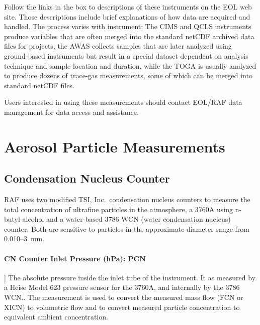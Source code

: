 \documentclass[
  english,
]{book}
\newcommand{\textgreek}[2][]{\foreignlanguage{greek}{#2}}
\begin{document}
Follow the links in the box to descriptions of these instruments on the EOL web site. Those descriptions include brief explanations of how data are acquired and handled. The process varies with instrument; The CIMS and QCLS instruments produce variables that are often merged into the standard netCDF archived data files for projects, the AWAS collects samples that are later analyzed using ground-based instruments but result in a special dataset dependent on analysis technique and sample location and duration, while the TOGA is usually analyzed to produce dozens of trace-gas measurements, some of which can be merged into standard netCDF files.

Users interested in using these measurements should contact EOL/RAF data management for data access and assistance.

\hypertarget{aerosol-particle-measurements}{%
\chapter{Aerosol Particle Measurements}\label{aerosol-particle-measurements}}

\hypertarget{condensation-nucleus-counter}{%
\section{Condensation Nucleus Counter}\label{condensation-nucleus-counter}}

RAF uses two modified TSI, Inc.~condensation nucleus counters to measure the total concentration of ultrafine particles in the atmosphere, a 3760A using n-butyl alcohol and a water-based 3786 WCN (water condensation nucleus) counter. Both are sensitive to particles in the approximate diameter range from 0.010--3~\textgreek{m}m.

\hypertarget{pcn}{%
\subsubsection*{CN Counter Inlet Pressure (hPa): PCN}\label{pcn}}

{]}
The absolute pressure inside the inlet tube of the instrument. It as measured by a Heise Model 623 pressure sensor for the 3760A, and internally by the 3786 WCN.. The measurement is used to convert the measured mass flow (FCN or XICN) to volumetric flow and to convert measured particle concentration to equivalent ambient concentration.
\end{document}
